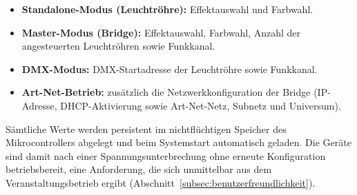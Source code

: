 \begin{itemize}
    \item \textbf{Standalone-Modus (Leuchtröhre):} Effektauswahl und Farbwahl.
    \item \textbf{Master-Modus (Bridge):} Effektauswahl, Farbwahl, Anzahl der
          angesteuerten Leuchtröhren sowie Funkkanal.
    \item \textbf{DMX-Modus:} DMX-Startadresse der Leuchtröhre sowie Funkkanal.
    \item \textbf{Art-Net-Betrieb:} zusätzlich die Netzwerkkonfiguration der Bridge
          (IP-Adresse, DHCP-Aktivierung sowie Art-Net-Netz, Subnetz und Universum).
\end{itemize}

Sämtliche Werte werden persistent im nichtflüchtigen Speicher des Mikrocontrollers
abgelegt und beim Systemstart automatisch geladen. Die Geräte sind damit nach einer
Spannungsunterbrechung ohne erneute Konfiguration betriebsbereit, eine Anforderung, die
sich unmittelbar aus dem Veranstaltungsbetrieb ergibt
(Abschnitt~\ref{subsec:benutzerfreundlichkeit}).
